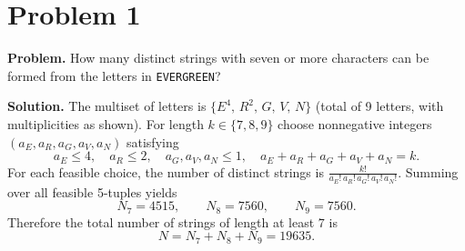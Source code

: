 \section*{Problem 1}
\textbf{Problem.} How many distinct strings with seven or more characters can be formed from the letters in \texttt{EVERGREEN}?

\medskip
\textbf{Solution.}
The multiset of letters is
\(\{E^4,\,R^2,\,G,\,V,\,N\}\) (total of 9 letters, with multiplicities as shown).
For length \(k\in\{7,8,9\}\) choose nonnegative integers
\((a_E,a_R,a_G,a_V,a_N)\) satisfying
\[
a_E\le 4,\quad a_R\le 2,\quad a_G,a_V,a_N\le 1,\quad
a_E+a_R+a_G+a_V+a_N=k.
\]
For each feasible choice, the number of distinct strings is
\(\frac{k!}{a_E!\,a_R!\,a_G!\,a_V!\,a_N!}\).
Summing over all feasible 5-tuples yields
\[
N_7 = 4515,\qquad
N_8 = 7560,\qquad
N_9 = 7560.
\]
Therefore the total number of strings of length at least \(7\) is
\[
N = N_7+N_8+N_9 = \boxed{19635}.
\]

